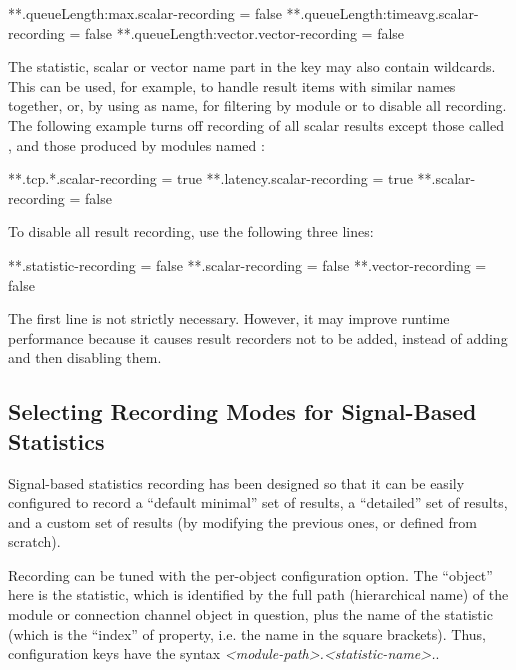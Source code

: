 \begin{inifile}
**.queueLength:max.scalar-recording = false
**.queueLength:timeavg.scalar-recording = false
**.queueLength:vector.vector-recording = false
\end{inifile}

The statistic, scalar or vector name part in the key may also contain
wildcards. This can be used, for example, to handle result items with
similar names together, or, by using \ttt{*} as name, for filtering by
module or to disable all recording. The following example turns off
recording of all scalar results except those called , and those
produced by modules named :

\begin{inifile}
**.tcp.*.scalar-recording = true
**.latency.scalar-recording = true
**.scalar-recording = false
\end{inifile}

To disable all result recording, use the following three lines:

\begin{inifile}
**.statistic-recording = false
**.scalar-recording = false
**.vector-recording = false
\end{inifile}

The first line is not strictly necessary. However, it may improve runtime
performance because it causes result recorders not to be added, instead of
adding and then disabling them.


\subsection{Selecting Recording Modes for Signal-Based Statistics}
\label{sec:ana-sim:configuring-recording-modes}

Signal-based statistics recording has been designed so that it can be
easily configured to record a ``default minimal'' set of results, a
``detailed'' set of results, and a custom set of results (by modifying
the previous ones, or defined from scratch).

Recording can be tuned with the 
per-object configuration option. The ``object'' here is the statistic,
which is identified by the full path (hierarchical name) of the module or
connection channel object in question, plus the name of the statistic
(which is the ``index'' of  property, i.e. the name in
the square brackets). Thus, configuration keys have the syntax
\textit{<module-path>.<statistic-name>.}.

